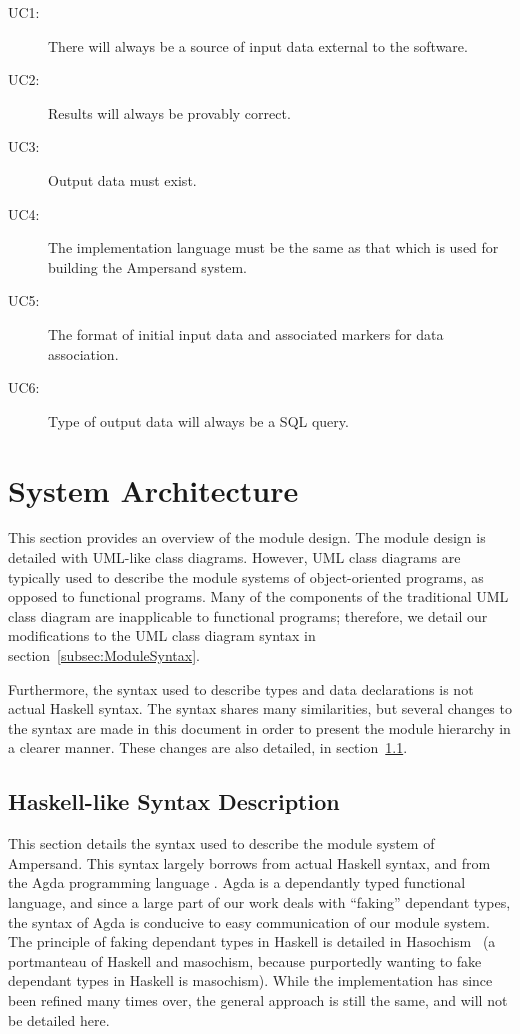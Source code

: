 \documentclass[12pt, svgnames]{article}
\let\Oldsubsection\subsection
\renewcommand{\subsection}{\FloatBarrier\Oldsubsection}
\begin{document}
\begin{description}
    \item[UC1:] There will always be a source of input data external to the 
    software.
    \item[UC2:] Results will always be provably correct.
    \item[UC3:] Output data must exist.
    \item[UC4:] The implementation language must be the same as that which is 
    used for building the Ampersand system.
    \item[UC5:] The format of initial input data and associated markers for 
    data association.
    \item[UC6:] Type of output data will always be a SQL query.
\end{description}


\newpage
\section{System Architecture} \label{SystemArch}

This section provides an overview of the module design. The module design is
detailed with UML-like class diagrams. However, UML class diagrams are typically
used to describe the module systems of object-oriented programs, as opposed to
functional programs. Many of the components of the traditional UML class
diagram are inapplicable to functional programs; therefore, we detail our
modifications to the UML class diagram syntax in section~\ref{subsec:ModuleSyntax}. 

Furthermore, the syntax used to describe types and data declarations is not
actual Haskell syntax. The syntax shares many similarities, but several changes
to the syntax are made in this document in order to present the module hierarchy
in a clearer manner. These changes are also detailed, in section~\ref{subsec:HaskellSyntax}. 


\subsection{Haskell-like Syntax Description}\label{subsec:HaskellSyntax}

This section details the syntax used to describe the module system of
Ampersand. This syntax largely borrows from actual Haskell syntax, and from the
Agda programming language \cite{agda}. Agda is a dependantly typed functional
language, and since a large part of our work deals with ``faking'' dependant
types, the syntax of Agda is conducive to easy communication of our module system. The
principle of faking dependant types in Haskell is detailed in
Hasochism~\cite{hasochism} (a portmanteau of Haskell and masochism, because
purportedly wanting to fake dependant types in Haskell is masochism). While the
implementation has since been refined many times over, the general approach is still the
same, and will not be detailed here.
\end{document}
